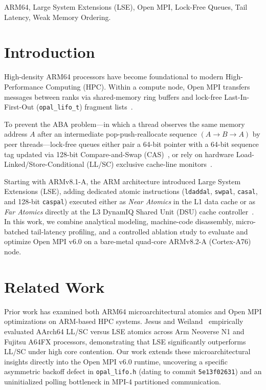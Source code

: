 \documentclass[conference]{IEEEtran}
\begin{document}
\begin{IEEEkeywords}
ARM64, Large System Extensions (LSE), Open MPI, Lock-Free Queues, Tail Latency, Weak Memory Ordering.
\end{IEEEkeywords}

\section{Introduction}
High-density ARM64 processors have become foundational to modern High-Performance Computing (HPC). Within a compute node, Open MPI transfers messages between ranks via shared-memory ring buffers and lock-free Last-In-First-Out (\texttt{opal\_lifo\_t}) fragment lists~\cite{gabriel2004openmpi,gutierrez2012cray}.

To prevent the ABA problem---in which a thread observes the same memory address $A$ after an intermediate pop-push-reallocate sequence $(A \to B \to A)$ by peer threads---lock-free queues either pair a 64-bit pointer with a 64-bit sequence tag updated via 128-bit Compare-and-Swap (CAS)~\cite{herlihy2021art}, or rely on hardware Load-Linked/Store-Conditional (LL/SC) exclusive cache-line monitors~\cite{arm_arm_v8}.

Starting with ARMv8.1-A, the ARM architecture introduced Large System Extensions (LSE), adding dedicated atomic instructions (\texttt{ldaddal}, \texttt{swpal}, \texttt{casal}, and 128-bit \texttt{caspal}) executed either as \emph{Near Atomics} in the L1 data cache or as \emph{Far Atomics} directly at the L3 DynamIQ Shared Unit (DSU) cache controller~\cite{arm_arm_v8}. In this work, we combine analytical modeling, machine-code disassembly, micro-batched tail-latency profiling, and a controlled ablation study to evaluate and optimize Open MPI v6.0 on a bare-metal quad-core ARMv8.2-A (Cortex-A76) node.

\section{Related Work}
Prior work has examined both ARM64 microarchitectural atomics and Open MPI optimizations on ARM-based HPC systems. Jesus and Weiland~\cite{jesus2023aarch64} empirically evaluated AArch64 LL/SC versus LSE atomics across Arm Neoverse N1 and Fujitsu A64FX processors, demonstrating that LSE significantly outperforms LL/SC under high core contention. Our work extends these microarchitectural insights directly into the Open MPI v6.0 runtime, uncovering a specific asymmetric backoff defect in \texttt{opal\_lifo.h} (dating to commit \texttt{5e13f02631}) and an uninitialized polling bottleneck in MPI-4 partitioned communication.
\end{document}
